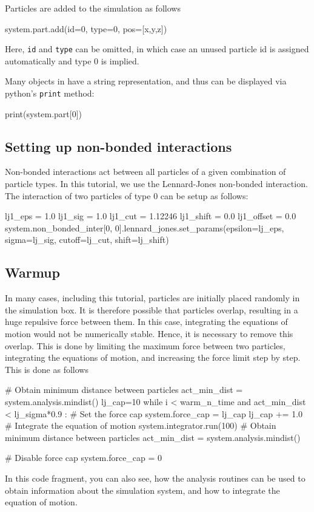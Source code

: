 \documentclass[
paper=a4,                       %
fontsize=11pt,                  %
twoside,                        %
footsepline,                    %
headsepline,                    %
headinclude=false,              %
footinclude=false,              %
pagesize,                       %
]{scrartcl}
\begin{document}
Particles are added to the simulation as follows
\begin{pypresso}
system.part.add(id=0, type=0, pos=[x,y,z])
\end{pypresso}\vspace{0,2cm}
Here, \texttt{id} and \texttt{type} can be omitted, in which case an unused particle
id is assigned automatically and type 0 is implied.

Many objects in \es{} have a string representation, and thus can be displayed via python's \texttt{print} method:
\begin{pypresso}
print(system.part[0])
\end{pypresso}\vspace{0,2cm}


\subsection{Setting up non-bonded interactions}

Non-bonded interactions act between all particles of a given combination of particle types.
In this tutorial, we use the Lennard-Jones non-bonded interaction.
The interaction of two particles of type 0 can be setup as follows:
{\small\vspace{0,2cm}
\begin{pypresso}
lj1_eps     = 1.0
lj1_sig     = 1.0
lj1_cut     = 1.12246
lj1_shift   = 0.0
lj1_offset  = 0.0
system.non_bonded_inter[0, 0].lennard_jones.set_params(epsilon=lj_eps, sigma=lj_sig,
cutoff=lj_cut, shift=lj_shift)
\end{pypresso}
}\vspace{0,2cm}


\subsection{Warmup}

In many cases, including this tutorial, particles are initially placed randomly in the simulation box. It is therefore possible that particles overlap, resulting in a huge repulsive force between them. In this case, integrating the equations of motion would not be numerically stable. Hence, it is necessary to remove this overlap.
This is done by limiting the maximum force between two particles, integrating the equations of motion, and increasing the force limit step by step.
This is done as follows
\begin{pypresso}
# Obtain minimum distance between particles
act_min_dist = system.analysis.mindist()
lj_cap=10
while i < warm_n_time and act_min_dist < lj_sigma*0.9 :
    # Set the force cap
    system.force_cap = lj_cap
    lj_cap += 1.0
    # Integrate the equation of motion
    system.integrator.run(100)
    # Obtain minimum distance between particles
    act_min_dist = system.analysis.mindist()

# Disable force cap
system.force_cap = 0
\end{pypresso}
In this code fragment, you can also see, how the analysis routines can be used to obtain information about the simulation system, and how to integrate the equation of motion.
\end{document}

